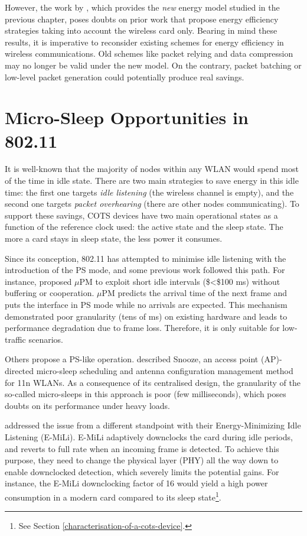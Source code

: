 \documentclass[twoside,nohyper]{tufte-book}
\theoremstyle{definition}
\theoremstyle{definition}
\theoremstyle{definition}
\theoremstyle{remark}
\begin{document}
However, the work by \citet{Serrano2014}, which provides the \emph{new}
energy model studied in the previous chapter, poses doubts on prior work
that propose energy efficiency strategies taking into account the
wireless card only. Bearing in mind these results, it is imperative to
reconsider existing schemes for energy efficiency in wireless
communications. Old schemes like packet relying \citep{He2010} and data
compression \citep{Baek2004, Sharma2009} may no longer be valid under
the new model. On the contrary, packet batching or low-level packet
generation could potentially produce real savings.

\section{Micro-Sleep Opportunities in
802.11}\label{micro-sleep-opportunities-in-802.11-1}

It is well-known that the majority of nodes within any WLAN would spend
most of the time in idle state. There are two main strategies to save
energy in this idle time: the first one targets \emph{idle listening}
(the wireless channel is empty), and the second one targets \emph{packet
overhearing} (there are other nodes communicating). To support these
savings, COTS devices have two main operational states as a function of
the reference clock used: the active state and the sleep state. The more
a card stays in sleep state, the less power it consumes.

Since its conception, 802.11 has attempted to minimise idle listening
with the introduction of the PS mode, and some previous work followed
this path. For instance, \citet{Liu2008} proposed \(\mu\)PM to exploit
short idle intervals (\$\textless{}\$100 ms) without buffering or
cooperation. \(\mu\)PM predicts the arrival time of the next frame and
puts the interface in PS mode while no arrivals are expected. This
mechanism demonstrated poor granularity (tens of ms) on existing
hardware and leads to performance degradation due to frame loss.
Therefore, it is only suitable for low-traffic scenarios.

Others propose a PS-like operation. \citet{Jang2011} described Snooze,
an access point (AP)-directed micro-sleep scheduling and antenna
configuration management method for 11n WLANs. As a consequence of its
centralised design, the granularity of the so-called micro-sleeps in
this approach is poor (few milliseconds), which poses doubts on its
performance under heavy loads.

\citet{Zhang2012} addressed the issue from a different standpoint with
their Energy-Minimizing Idle Listening (E-MiLi). E-MiLi adaptively
downclocks the card during idle periods, and reverts to full rate when
an incoming frame is detected. To achieve this purpose, they need to
change the physical layer (PHY) all the way down to enable downclocked
detection, which severely limits the potential gains. For instance, the
E-MiLi downclocking factor of 16 would yield a high power consumption in
a modern card compared to its sleep state\footnote{See Section
  \ref{characterisation-of-a-cots-device}.}.
\end{document}
